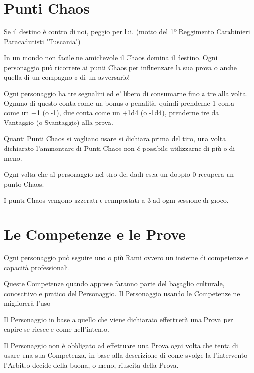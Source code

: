 \documentclass[12pt,a4paper,twoside,openany]{book}
\begin{document}
\section{Punti Chaos}

\begin{multicols}{2}
	

\begin{changemargin}{0.3cm}{0.3cm}\begin{enfasi}{Se il destino è contro di noi, peggio per lui. (motto del 1º Reggimento Carabinieri Paracadutisti "Tuscania")}\end{enfasi}\end{changemargin}

In un mondo non facile ne amichevole il Chaos domina il destino. Ogni personaggio può ricorrere ai punti Chaos per influenzare la sua prova o anche quella di un compagno o di un avversario!

Ogni personaggio ha tre segnalini ed e' libero di consumarne fino a tre alla volta. Ognuno di questo conta come un bonus o penalità, quindi prenderne 1 conta come un +1 (o -1), due conta come un +1d4 (o -1d4), prenderne tre da Vantaggio (o Svantaggio) alla prova. 

Quanti Punti Chaos si vogliano usare si dichiara prima del tiro, una volta dichiarato l'ammontare di Punti Chaos non é possibile utilizzarne di più o di meno.

Ogni volta che al personaggio nel tiro dei dadi esca un doppio 0 recupera un punto Chaos.

I punti Chaos vengono azzerati e reimpostati a 3 ad ogni sessione di gioco.

\end{multicols}

\pagebreak

\section{Le Competenze e le Prove}

\begin{multicols}{2}

Ogni personaggio può seguire uno o più Rami ovvero un insieme di competenze e capacità professionali.

Queste Competenze quando apprese faranno parte del bagaglio culturale, conoscitivo e pratico del Personaggio. Il Personaggio usando le Competenze ne migliorerà l'uso.

Il Personaggio in base a quello che viene dichiarato effettuerà una Prova per capire se riesce e come nell'intento. 

\begin{narratore}
Il Personaggio non è obbligato ad effettuare una Prova ogni volta che tenta di usare una sua Competenza, in base alla descrizione di come svolge la l'intervento l'Arbitro decide della buona, o meno, riuscita della Prova.	
\end{narratore}

\end{multicols}
\end{document}
